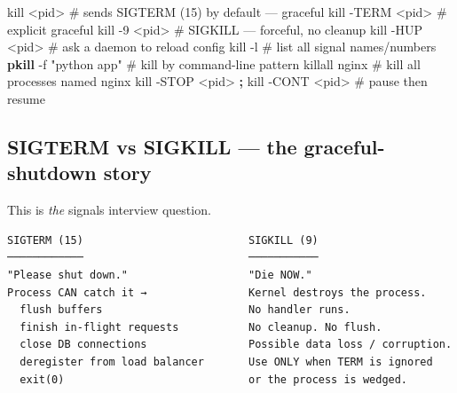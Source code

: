 \documentclass[11pt]{article}
\newenvironment{Shaded}{\begin{snugshade}}{\end{snugshade}}
\newcommand{\AttributeTok}[1]{\textcolor[rgb]{0.16,0.50,0.73}{#1}}
\newcommand{\BuiltInTok}[1]{\textcolor[rgb]{0.50,0.55,0.55}{#1}}
\newcommand{\CommentTok}[1]{\textcolor[rgb]{0.48,0.49,0.49}{#1}}
\newcommand{\ExtensionTok}[1]{\textcolor[rgb]{0.00,0.60,1.00}{\textbf{#1}}}
\newcommand{\FunctionTok}[1]{\textcolor[rgb]{0.56,0.27,0.68}{#1}}
\newcommand{\KeywordTok}[1]{\textcolor[rgb]{0.81,0.81,0.76}{\textbf{#1}}}
\newcommand{\NormalTok}[1]{\textcolor[rgb]{0.81,0.81,0.76}{#1}}
\newcommand{\OperatorTok}[1]{\textcolor[rgb]{0.81,0.81,0.76}{#1}}
\newcommand{\StringTok}[1]{\textcolor[rgb]{0.96,0.31,0.31}{#1}}
\begin{document}

\begin{Shaded}
\begin{Highlighting}[]
\BuiltInTok{kill} \OperatorTok{\textless{}}\NormalTok{pid}\OperatorTok{\textgreater{}}             \CommentTok{\# sends SIGTERM (15) by default — graceful}
\BuiltInTok{kill} \AttributeTok{{-}TERM} \OperatorTok{\textless{}}\NormalTok{pid}\OperatorTok{\textgreater{}}       \CommentTok{\# explicit graceful}
\BuiltInTok{kill} \AttributeTok{{-}9} \OperatorTok{\textless{}}\NormalTok{pid}\OperatorTok{\textgreater{}}          \CommentTok{\# SIGKILL — forceful, no cleanup}
\BuiltInTok{kill} \AttributeTok{{-}HUP} \OperatorTok{\textless{}}\NormalTok{pid}\OperatorTok{\textgreater{}}        \CommentTok{\# ask a daemon to reload config}
\BuiltInTok{kill} \AttributeTok{{-}l}                \CommentTok{\# list all signal names/numbers}
\ExtensionTok{pkill} \AttributeTok{{-}f} \StringTok{"python app"}  \CommentTok{\# kill by command{-}line pattern}
\FunctionTok{killall}\NormalTok{ nginx          }\CommentTok{\# kill all processes named nginx}
\BuiltInTok{kill} \AttributeTok{{-}STOP} \OperatorTok{\textless{}}\NormalTok{pid}\OperatorTok{\textgreater{}} \KeywordTok{;} \BuiltInTok{kill} \AttributeTok{{-}CONT} \OperatorTok{\textless{}}\NormalTok{pid}\OperatorTok{\textgreater{}}   \CommentTok{\# pause then resume}
\end{Highlighting}
\end{Shaded}

\subsection{SIGTERM vs SIGKILL --- the graceful-shutdown story}\label{sigterm-vs-sigkill--the-graceful-shutdown-story}

This is \emph{the} signals interview question.

\setcodelang{}

\begin{verbatim}
SIGTERM (15)                          SIGKILL (9)
────────────                          ───────────
"Please shut down."                   "Die NOW."
Process CAN catch it →                Kernel destroys the process.
  flush buffers                       No handler runs.
  finish in-flight requests           No cleanup. No flush.
  close DB connections                Possible data loss / corruption.
  deregister from load balancer       Use ONLY when TERM is ignored
  exit(0)                             or the process is wedged.
\end{verbatim}
\end{document}
